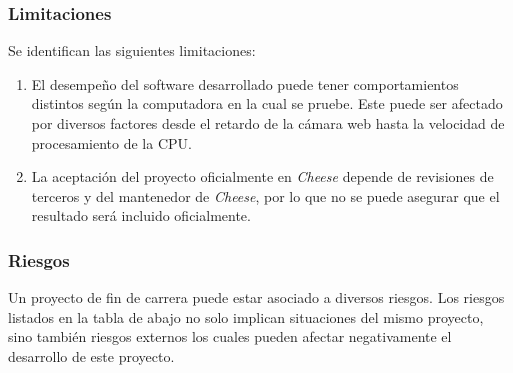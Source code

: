 \documentclass[a4paper,openright,12pt]{report}
\begin{document}
\subsubsection{Limitaciones}
Se identifican las siguientes limitaciones:

\begin{enumerate}
    \item El desempeño del software desarrollado puede tener comportamientos
      distintos según la computadora en la cual se pruebe. Este puede ser
      afectado por diversos factores desde el retardo de la cámara web hasta la
      velocidad de procesamiento de la CPU.
    \item La aceptación del proyecto oficialmente en \textit{Cheese} depende de
      revisiones de terceros y del mantenedor de \textit{Cheese}, por lo que no
      se puede asegurar que el resultado será incluido oficialmente.
\end{enumerate}

\subsubsection{Riesgos}
Un proyecto de fin de carrera puede estar asociado a diversos riesgos. Los
riesgos listados en la tabla de abajo no solo implican situaciones del mismo
proyecto, sino también riesgos externos los cuales pueden afectar negativamente
el desarrollo de este proyecto.
\end{document}
